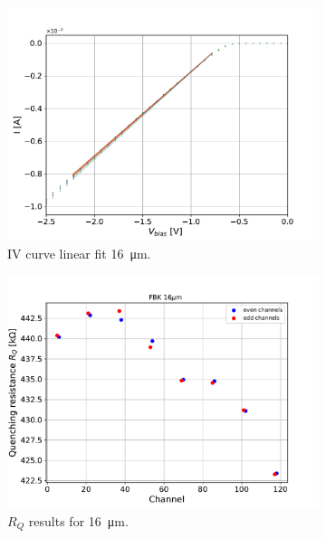 \begin{figure}[htbp]
  \centering
  \begin{subfigure}{0.48\textwidth}
    \includegraphics[width=\textwidth]{gfx/plots/Rq/16/FBK_16um_IV.pdf}
    \caption{IV curve linear fit \SI{16}{\micro m}.}
    \label{fig:}
  \end{subfigure}
  \hfill
  \begin{subfigure}{0.48\textwidth}
    \includegraphics[width=\textwidth]{gfx/plots/Rq/16/FBK_16um_RQs.pdf}
    \caption{$R_Q$ results for \SI{16}{\micro m}.}
    \label{fig:}
  \end{subfigure}
  \begin{subfigure}{0.48\textwidth}

\end{subfigure}
\end{figure}

